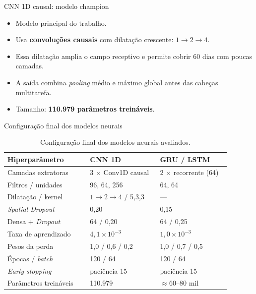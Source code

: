 \documentclass{libs/ufc_format}
\begin{document}
\begin{frame}{CNN 1D causal: modelo champion}
    \begin{itemize}
        \item Modelo principal do trabalho.
        \item Usa \textbf{convoluções causais} com dilatação crescente: $1 \rightarrow 2 \rightarrow 4$.
        \item Essa dilatação amplia o campo receptivo e permite cobrir 60 dias com poucas camadas.
        \item A saída combina \emph{pooling} médio e máximo global antes das cabeças multitarefa.
        \item Tamanho: \textbf{110.979 parâmetros treináveis}.
    \end{itemize}

    \vspace{0.3cm}
\end{frame}

\begin{frame}{Configuração final dos modelos neurais}
    \scriptsize
    \begin{table}
    \centering
    \caption{Configuração final dos modelos neurais avaliados.}
    \begin{tabular}{p{0.33\linewidth} p{0.28\linewidth} p{0.28\linewidth}}
        \toprule
        \textbf{Hiperparâmetro} & \textbf{CNN 1D} & \textbf{GRU / LSTM} \\
        \midrule
        Camadas extratoras & 3 $\times$ Conv1D causal & 2 $\times$ recorrente (64) \\
        Filtros / unidades & 96, 64, 256 & 64, 64 \\
        Dilatação / kernel & $1{\to}2{\to}4$ / 5,3,3 & --- \\
        \emph{Spatial Dropout} & 0{,}20 & 0{,}15 \\
        Densa + \emph{Dropout} & 64 / 0{,}20 & 64 / 0{,}25 \\
        Taxa de aprendizado & $4{,}1\times10^{-3}$ & $1{,}0\times10^{-3}$ \\
        Pesos da perda & 1{,}0 / 0{,}6 / 0{,}2 & 1{,}0 / 0{,}7 / 0{,}5 \\
        Épocas / \emph{batch} & 120 / 64 & 120 / 64 \\
        \emph{Early stopping} & paciência 15 & paciência 15 \\
        Parâmetros treináveis & 110.979 & $\approx 60$--$80$ mil \\
        \bottomrule
    \end{tabular}
    \end{table}
\end{frame}
\end{document}
